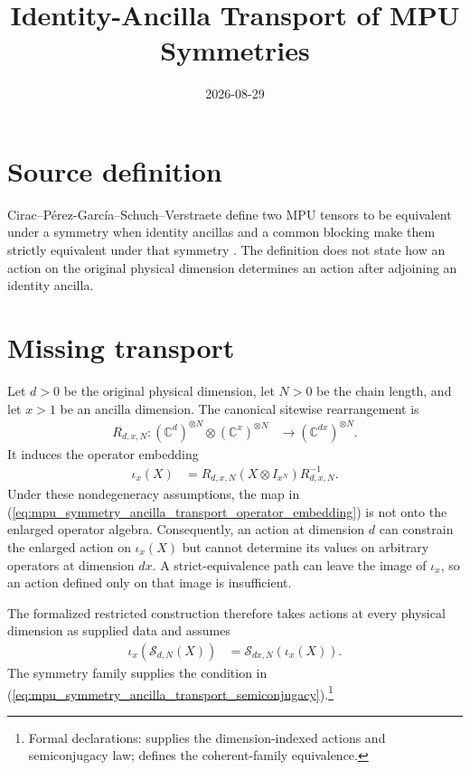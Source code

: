 \documentclass{article}
\title{Identity-Ancilla Transport of MPU Symmetries}
\author{}
\date{2026-08-29}
\begin{document}
\maketitle
{}

\section{Source definition}

Cirac--P\'erez-Garc\'ia--Schuch--Verstraete define two MPU tensors to be
equivalent under a symmetry when identity ancillas and a common blocking make
them strictly equivalent under that symmetry
\cite[lines~1356--1366]{Cirac2017MPU}. The definition does not state how an
action on the original physical dimension determines an action after adjoining
an identity ancilla.

\section{Missing transport}

Let $d>0$ be the original physical dimension, let $N>0$ be the chain length,
and let $x>1$ be an ancilla dimension. The canonical sitewise rearrangement is
\begin{align}
    R_{d,x,N}\colon
    (\mathbb C^d)^{\otimes N}\otimes(\mathbb C^x)^{\otimes N}
     & \longrightarrow (\mathbb C^{dx})^{\otimes N}.
    \label{eq:mpu_symmetry_ancilla_transport_sitewise_rearrangement}
\end{align}
It induces the operator embedding
\begin{align}
    \iota_x(X)
     & = R_{d,x,N}(X\otimes I_{x^N})R_{d,x,N}^{-1}.
    \label{eq:mpu_symmetry_ancilla_transport_operator_embedding}
\end{align}
Under these nondegeneracy assumptions, the map in
(\ref{eq:mpu_symmetry_ancilla_transport_operator_embedding}) is not onto the
enlarged operator algebra. Consequently, an action at dimension $d$ can
constrain the enlarged action on $\iota_x(X)$ but cannot determine its values
on arbitrary operators at dimension $dx$. A strict-equivalence path can leave
the image of $\iota_x$, so an action defined only on that image is insufficient.

The formalized restricted construction therefore takes actions at every
physical dimension as supplied data and assumes
\begin{align}
    \iota_x(\mathcal S_{d,N}(X))
     & = \mathcal S_{dx,N}(\iota_x(X)).
    \label{eq:mpu_symmetry_ancilla_transport_semiconjugacy}
\end{align}
The symmetry family supplies the condition in
(\ref{eq:mpu_symmetry_ancilla_transport_semiconjugacy}).\footnote{Formal declarations:
     supplies the
    dimension-indexed actions and semiconjugacy law;
     defines the
    coherent-family equivalence.}
\end{document}
